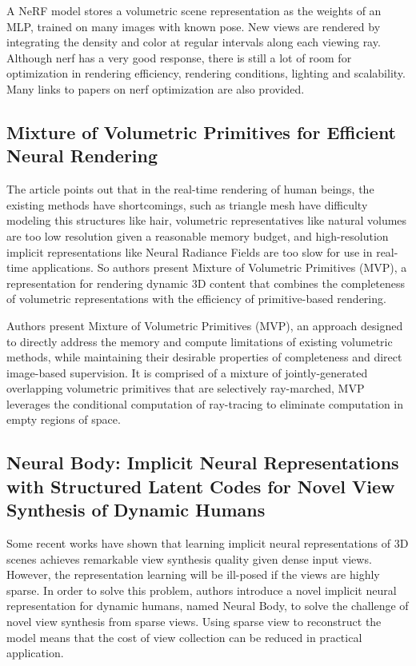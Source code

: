 \documentclass[UTF-8]{ctexart}
\begin{document}
A NeRF model stores a volumetric scene representation as the weights of an MLP, trained on many images with known pose. New views are rendered by integrating the density and color at regular intervals along each viewing ray. Although nerf has a very good response, there is still a lot of room for optimization in rendering efficiency, rendering conditions, lighting and scalability. Many links to papers on nerf optimization are also provided.

\subsection{Mixture of Volumetric Primitives for Efficient Neural Rendering}
The article points out that in the real-time rendering of human beings, the existing methods have shortcomings, such as triangle mesh have difficulty modeling this structures like hair, volumetric representatives like natural volumes are too low resolution given a reasonable memory budget, and high-resolution implicit representations like Neural Radiance Fields are too slow for use in real-time applications. So authors present Mixture of Volumetric Primitives (MVP), a representation for rendering dynamic 3D content that combines the completeness of volumetric representations with the efficiency of primitive-based rendering. \par

Authors present Mixture of Volumetric Primitives (MVP), an approach designed to directly address the memory and compute limitations of existing volumetric methods, while maintaining their desirable properties of completeness and direct image-based supervision. It is comprised of a mixture of jointly-generated overlapping volumetric primitives that are selectively ray-marched, MVP leverages the conditional computation of ray-tracing to eliminate computation in empty regions of space.

\subsection{Neural Body: Implicit Neural Representations with Structured Latent Codes for Novel View Synthesis of Dynamic Humans}
Some recent works have shown that learning implicit neural representations of 3D scenes achieves remarkable view synthesis quality given dense input views. However, the representation learning will be ill-posed if the views are highly sparse. In order to solve this problem, authors introduce a novel implicit neural representation for dynamic humans, named Neural Body, to solve the challenge of novel view synthesis from sparse views. Using sparse view to reconstruct the model means that the cost of view collection can be reduced in practical application.\par
\end{document}
